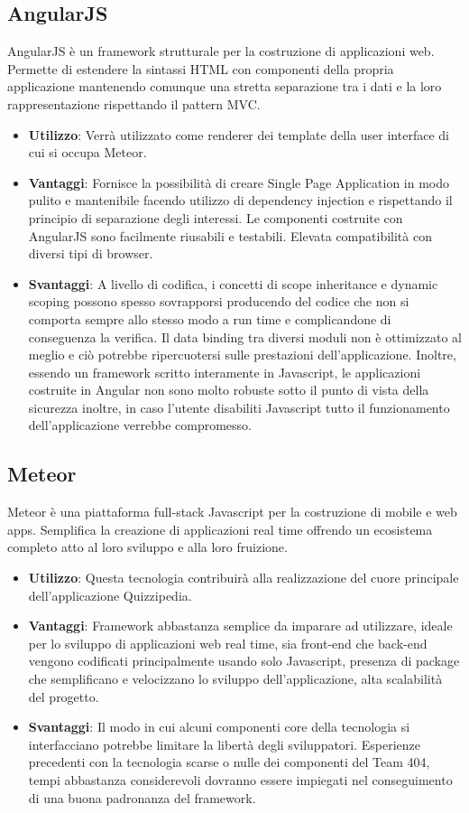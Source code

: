 	\subsection{AngularJS}
	AngularJS è un framework strutturale per la costruzione di applicazioni web. Permette di estendere la sintassi HTML con componenti della propria applicazione mantenendo comunque una stretta separazione tra i dati e la loro rappresentazione rispettando il pattern MVC.
	\begin{itemize}
		\item\textbf{Utilizzo}: Verrà utilizzato come renderer dei template della user interface di cui si occupa Meteor.
		\item\textbf{Vantaggi}: Fornisce la possibilità di creare Single Page Application in modo pulito e mantenibile facendo utilizzo di dependency injection e rispettando il principio di separazione degli interessi. Le componenti costruite con AngularJS sono facilmente riusabili e testabili. Elevata compatibilità con diversi tipi di browser.
		\item\textbf{Svantaggi}: A livello di codifica, i concetti di scope inheritance e dynamic scoping possono spesso sovrapporsi producendo del codice che non si comporta sempre allo stesso modo a run time e complicandone di conseguenza la verifica. Il data binding tra diversi moduli non è ottimizzato al meglio e ciò potrebbe ripercuotersi sulle prestazioni dell'applicazione. Inoltre, essendo un framework scritto interamente in Javascript, le applicazioni costruite in Angular non sono molto robuste sotto il punto di vista della sicurezza inoltre, in caso l'utente disabiliti Javascript tutto il funzionamento dell'applicazione verrebbe compromesso.
	\end{itemize}
	\subsection{Meteor}
	Meteor è una piattaforma full-stack Javascript per la costruzione di mobile e web apps. Semplifica la creazione di applicazioni real time offrendo un ecosistema completo atto al loro sviluppo e alla loro fruizione.
	\begin{itemize}
		\item\textbf{Utilizzo}: Questa tecnologia contribuirà alla realizzazione del cuore principale dell'applicazione Quizzipedia.
		\item\textbf{Vantaggi}: Framework abbastanza semplice da imparare ad utilizzare, ideale per lo sviluppo di applicazioni web real time, sia front-end che back-end vengono codificati principalmente usando solo Javascript, presenza di package che semplificano e velocizzano lo sviluppo dell'applicazione, alta scalabilità del progetto.
		\item\textbf{Svantaggi}: Il modo in cui alcuni componenti core della tecnologia si interfacciano potrebbe limitare la libertà degli sviluppatori. Esperienze precedenti con la tecnologia scarse o nulle dei componenti del Team 404, tempi abbastanza considerevoli dovranno essere impiegati nel conseguimento di una buona padronanza del framework.
	\end{itemize}
	\newpage